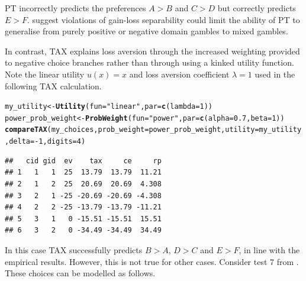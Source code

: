 \documentclass{article}\usepackage[]{graphicx}\usepackage[]{color}
\makeatletter
\newcommand{\hlnum}[1]{\textcolor[rgb]{0.686,0.059,0.569}{#1}}%
\newcommand{\hlstr}[1]{\textcolor[rgb]{0.192,0.494,0.8}{#1}}%
\newcommand{\hlopt}[1]{\textcolor[rgb]{0,0,0}{#1}}%
\newcommand{\hlstd}[1]{\textcolor[rgb]{0.345,0.345,0.345}{#1}}%
\newcommand{\hlkwb}[1]{\textcolor[rgb]{0.69,0.353,0.396}{#1}}%
\newcommand{\hlkwc}[1]{\textcolor[rgb]{0.333,0.667,0.333}{#1}}%
\newcommand{\hlkwd}[1]{\textcolor[rgb]{0.737,0.353,0.396}{\textbf{#1}}}%
\newenvironment{kframe}{%
 \def\at@end@of@kframe{}%
 \ifinner\ifhmode%
  \def\at@end@of@kframe{\end{minipage}}%
  \begin{minipage}{\columnwidth}%
 \fi\fi%
 \def\FrameCommand##1{\hskip\@totalleftmargin \hskip-\fboxsep
 \colorbox{shadecolor}{##1}\hskip-\fboxsep
     \hskip-\linewidth \hskip-\@totalleftmargin \hskip\columnwidth}%
 \MakeFramed {\advance\hsize-\width
   \@totalleftmargin\z@ \linewidth\hsize
   \@setminipage}}%
 {\par\unskip\endMakeFramed%
 \at@end@of@kframe}
\newenvironment{knitrout}{}{} %
\makeatother
\begin{document}
PT incorrectly predicts the preferences $A > B$ and $C > D$ but correctly predicts $E > F$.
\cite{Por_Budescu_2013} suggest violations of gain-loss separability could limit the ability of PT to generalise from purely positive or negative domain gambles to mixed gambles.

In contrast, TAX explains loss aversion through the increased weighting provided to negative choice branches
rather than through using a kinked utility function. Note the linear utility $u(x) = x$ and loss aversion coefficient $\lambda = 1$ used in the following TAX calculation.

\begin{knitrout}
\color{fgcolor}\begin{kframe}
\begin{alltt}
\hlstd{my_utility} \hlkwb{<-} \hlkwd{Utility}\hlstd{(}\hlkwc{fun}\hlstd{=}\hlstr{"linear"}\hlstd{,} \hlkwc{par}\hlstd{=}\hlkwd{c}\hlstd{(}\hlkwc{lambda}\hlstd{=}\hlnum{1}\hlstd{))}
\hlstd{power_prob_weight} \hlkwb{<-} \hlkwd{ProbWeight}\hlstd{(}\hlkwc{fun}\hlstd{=}\hlstr{"power"}\hlstd{,} \hlkwc{par}\hlstd{=}\hlkwd{c}\hlstd{(}\hlkwc{alpha}\hlstd{=}\hlnum{0.7}\hlstd{,} \hlkwc{beta}\hlstd{=}\hlnum{1}\hlstd{))}
\hlkwd{compareTAX}\hlstd{(my_choices,} \hlkwc{prob_weight}\hlstd{=power_prob_weight,} \hlkwc{utility}\hlstd{=my_utility,} \hlkwc{delta}\hlstd{=}\hlopt{-}\hlnum{1}\hlstd{,} \hlkwc{digits}\hlstd{=}\hlnum{4}\hlstd{)}
\end{alltt}
\begin{verbatim}
##   cid gid  ev    tax     ce     rp
## 1   1   1  25  13.79  13.79  11.21
## 2   1   2  25  20.69  20.69  4.308
## 3   2   1 -25 -20.69 -20.69 -4.308
## 4   2   2 -25 -13.79 -13.79 -11.21
## 5   3   1   0 -15.51 -15.51  15.51
## 6   3   2   0 -34.49 -34.49  34.49
\end{verbatim}
\end{kframe}
\end{knitrout}


In this case TAX successfully predicts $B > A$, $D > C$ and $E > F$, in line with the empirical results.
However, this is not true for other cases.
Consider test 7 from \citet[][Table 1 p. 1326]{Wu_Markle_2008}. These choices can be modelled as follows.
\end{document}
